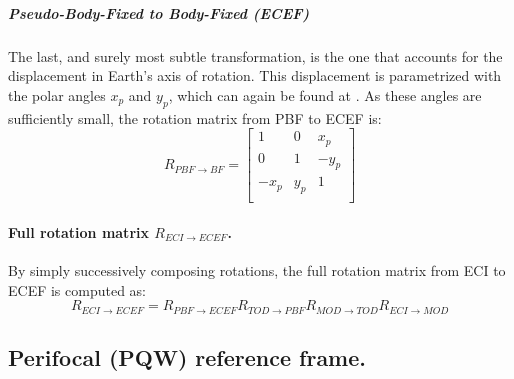 		\subparagraph{Pseudo-Body-Fixed to Body-Fixed (ECEF)\\}
		\indent The last, and surely most subtle transformation, is the one that accounts for the displacement in Earth's axis of rotation. This displacement is parametrized with the polar angles $x_p$ and $y_p$, which can again be found at \cite{IERS_conventions}. As these angles are sufficiently small, the rotation matrix from PBF to ECEF is:\\
		\begin{equation}
		R_{PBF\rightarrow BF} = 
		\left[ 
		\begin{array}{lll}
		1		& 0 	& x_p \\
		0 		& 1 	& -y_p \\
		-x_p 	& y_p 	& 1 \\
		\end{array}
		\right]
		\label{eq: R_PBF_ECEF}
		\end{equation}
		\paragraph{Full rotation matrix $R_{ECI\rightarrow ECEF}$. \\}
		\indent By simply successively composing rotations, the full rotation matrix from ECI to ECEF is computed as:
		\[
		R_{ECI\rightarrow ECEF} = R_{PBF \rightarrow ECEF} R_{TOD \rightarrow PBF} R_{MOD\rightarrow TOD} R_{ECI\rightarrow MOD}		
		\]
	\subsection{Perifocal (PQW) reference frame.} \label{sec: PQW}
